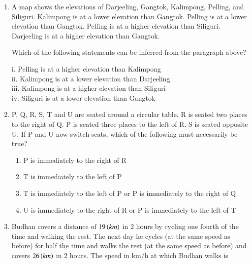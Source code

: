 \documentclass[journal,12pt,onecolumn]{IEEEtran}
\theoremstyle{remark}
\begin{document}
\begin{enumerate}
\item A map shows the elevations of Darjeeling, Gangtok, Kalimpong, Pelling, and Siliguri.
Kalimpong is at a lower elevation than Gangtok. Pelling is at a lower elevation than Gangtok.
Pelling is at a higher elevation than Siliguri. Darjeeling is at a higher elevation than Gangtok.

Which of the following statements can be inferred from the paragraph above?

i. Pelling is at a higher elevation than Kalimpong \\
ii. Kalimpong is at a lower elevation than Darjeeling \\
iii. Kalimpong is at a higher elevation than Siliguri \\
iv. Siliguri is at a lower elevation than Gangtok
\par \hfill{}

\begin{enumerate}
\end{enumerate}

\item P, Q, R, S, T and U are seated around a circular table. R is seated two places to the right of Q. P is
seated three places to the left of R. S is seated opposite U. If P and U now switch seats, which of
the following must necessarily be true?
\par \hfill{}
\begin{enumerate}
    \item P is immediately to the right of R
    \item T is immediately to the left of P
    \item T is immediately to the left of P or P is immediately to the right of Q
    \item U is immediately to the right of R or P is immediately to the left of T
\end{enumerate}

\item Budhan covers a distance of $19 \left(km\right)$ in $2$ hours by cycling one fourth of the time and walking the rest. The next day he cycles (at the same speed as before) for half the time and walks the rest (at the same speed as before) and covers $26 \left(km\right)$ in 2 hours. The speed in km/h at which Budhan walks is \par \hfill{}
\begin{enumerate}
\end{enumerate}


\end{enumerate}
\end{document}
